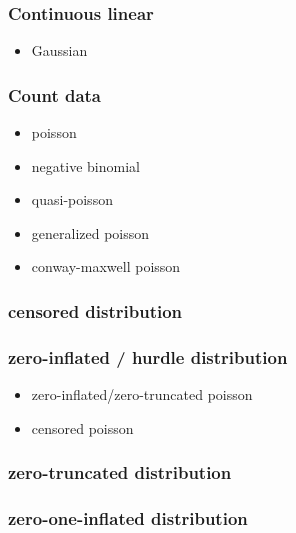 \documentclass[
  12pt,
]{book}
\providecommand{\tightlist}{%
  \setlength{\itemsep}{0pt}\setlength{\parskip}{0pt}}
\begin{document}
\hypertarget{continuous-linear}{%
\subsubsection{Continuous linear}\label{continuous-linear}}

\begin{itemize}
\tightlist
\item
  Gaussian
\end{itemize}

\hypertarget{count-data}{%
\subsubsection{Count data}\label{count-data}}

\begin{itemize}
\tightlist
\item
  poisson
\item
  negative binomial
\item
  quasi-poisson
\item
  generalized poisson
\item
  conway-maxwell poisson
\end{itemize}

\hypertarget{censored-distribution}{%
\subsubsection{censored distribution}\label{censored-distribution}}

\hypertarget{zero-inflated-hurdle-distribution}{%
\subsubsection{zero-inflated / hurdle distribution}\label{zero-inflated-hurdle-distribution}}

\begin{itemize}
\tightlist
\item
  zero-inflated/zero-truncated poisson
\item
  censored poisson
\end{itemize}

\hypertarget{zero-truncated-distribution}{%
\subsubsection{zero-truncated distribution}\label{zero-truncated-distribution}}

\hypertarget{zero-one-inflated-distribution}{%
\subsubsection{zero-one-inflated distribution}\label{zero-one-inflated-distribution}}
\end{document}
